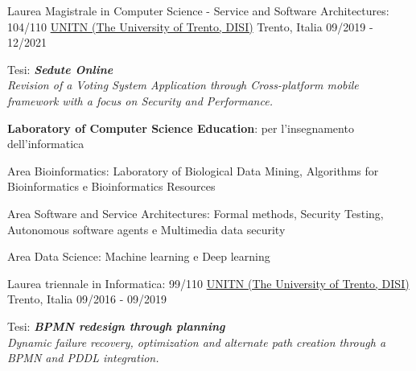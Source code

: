 

\begin{cventries}

\cventry
{Laurea Magistrale in Computer Science - Service and Software Architectures: 104/110} %
{\href{https://www.unitn.it/}{UNITN (The University of Trento, DISI)}}  %
{Trento, Italia} %
{09/2019 - 12/2021} %
{
  \begin{cvitems} %
    \item {Tesi: \textbf{\textit{Sedute Online}}\\\textit{Revision of a Voting System Application through Cross-platform mobile framework with a focus on Security and Performance.}}
    \item {\textbf{Laboratory of Computer Science Education}: per l'insegnamento dell'informatica}
    \item {Area Bioinformatics: Laboratory of Biological Data Mining, Algorithms for Bioinformatics e Bioinformatics Resources}
    \item {Area Software and Service Architectures: Formal methods, Security Testing, Autonomous software agents e Multimedia data security}
    \item {Area Data Science: Machine learning e Deep learning}
  \end{cvitems}
}

\cventry
{Laurea triennale in Informatica: 99/110} %
{\href{https://www.unitn.it/}{UNITN (The University of Trento, DISI)}}  %
{Trento, Italia} %
{09/2016 - 09/2019} %
{
  \begin{cvitems} %
    \item {Tesi: \textbf{\textit{BPMN redesign through planning}} \\\textit{Dynamic failure recovery, optimization and alternate path creation through a BPMN and PDDL integration.}}
  \end{cvitems}
}

\end{cventries}
